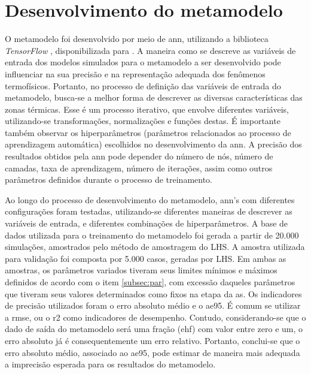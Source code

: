 \documentclass[brazil,hardcopy,openany]{ufscthesis} %
\begin{document}
\section{Desenvolvimento do metamodelo}

O metamodelo foi desenvolvido por meio de \acrfull{ann}, utilizando a biblioteca \textit{TensorFlow} \cite{tensorflow2015}, disponibilizada para .
A maneira como se descreve as variáveis de entrada dos modelos simulados para o metamodelo a ser desenvolvido pode influenciar na sua precisão e na representação adequada dos fenômenos termofísicos.
Portanto, no processo de definição das variáveis de entrada do metamodelo, busca-se a melhor forma de descrever as diversas características das zonas térmicas.
Esse é um processo iterativo, que envolve diferentes variáveis, utilizando-se transformações, normalizações e funções destas. 
É importante também observar os hiperparâmetros (parâmetros relacionados ao processo de aprendizagem automática) escolhidos no desenvolvimento da \acrshort{ann}. 
A precisão dos resultados obtidos pela \acrshort{ann} pode depender do número de nós, número de camadas, taxa de aprendizagem, número de iterações, assim como outros parâmetros definidos durante o processo de treinamento. 

Ao longo do processo de desenvolvimento do metamodelo, \acrshort{ann}'s com diferentes configurações foram testadas, utilizando-se diferentes maneiras de descrever as variáveis de entrada, e diferentes combinações de hiperparâmetros.
A base de dados utilizada para o treinamento do metamodelo foi gerada a partir de 20.000 simulações, amostrados pelo método de amostragem do LHS. %
A amostra utilizada para validação foi composta por 5.000 casos, geradas por LHS.
Em ambas as amostras, os parâmetros variados tiveram seus limites mínimos e máximos definidos de acordo com o item \ref{subsec:par}, com excessão daqueles parâmetros que tiveram seus valores determinados como fixos na etapa da \acrshort{as}.
Os indicadores de precisão utilizados foram o erro absoluto médio e o \acrfull{ae95}.
É comum se utilizar a \acrfull{rmse}, ou o \acrfull{r2} como indicadores de desempenho. Contudo, considerando-se que o dado de saída do metamodelo será uma fração (\acrshort{ehf}) com valor entre zero e um, o erro absoluto já é consequentemente um erro relativo. Portanto, conclui-se que o erro absoluto médio, associado ao \acrlong{ae95}, pode estimar de maneira mais adequada a imprecisão esperada para os resultados do metamodelo.
\end{document}
